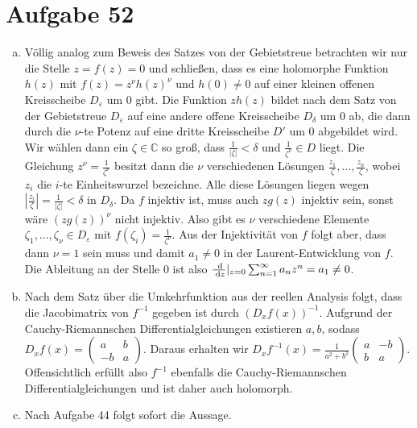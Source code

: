 \documentclass{article}
\theoremstyle{definition}
\newcommand{\C}{\mathbb{C}}
\renewcommand{\epsilon}{\varepsilon}
\newcommand{\dv}[2]{\frac{\d #1 }{\d #2 }}
\begin{document}
\section*{Aufgabe 52}
\begin{enumerate}[(a)]  
    \item Völlig analog zum Beweis des Satzes von der Gebietstreue betrachten wir nur die Stelle $z = f(z) = 0$ und schließen, dass es eine holomorphe Funktion $h(z)$ mit $f(z) = z^\nu h(z)^\nu$ und $h(0)\neq 0$ auf einer kleinen offenen Kreisscheibe $D_\epsilon$ um $0$ gibt. Die Funktion $zh(z)$ bildet nach dem Satz von der Gebietstreue $D_\epsilon$ auf eine andere offene Kreisscheibe $D_\delta$ um $0$ ab, die dann durch die $\nu$-te Potenz auf eine dritte Kreisscheibe $D'$ um 0 abgebildet wird. Wir wählen dann ein $\zeta \in \C$ so groß, dass $\frac{1}{|\zeta|} < \delta$ und $\frac{1}{\zeta^\nu}\in D$ liegt. Die Gleichung $z^\nu = \frac{1}{\zeta^\nu}$ besitzt dann die $\nu$ verschiedenen Lösungen $\frac{z_1}{\zeta}, \dots, \frac{z_n}{\zeta}$, wobei $z_i$ die $i$-te Einheitswurzel bezeichne. Alle diese Lösungen liegen wegen $\left|\frac{z_i}{\zeta}\right| = \frac{1}{|\zeta|} < \delta$ in $D_\delta$. Da $f$ injektiv ist, muss auch $zg(z)$ injektiv sein, sonst wäre $(zg(z))^\nu$ nicht injektiv. Also gibt es $\nu$ verschiedene Elemente $\zeta_1,\dots, \zeta_\nu\in D_\epsilon$ mit $f(\zeta_i) = \frac{1}{\zeta^\nu}$. Aus der Injektivität von $f$ folgt aber, dass dann $\nu = 1$ sein muss und damit $a_1 \neq 0$ in der Laurent-Entwicklung von $f$. Die Ableitung an der Stelle 0 ist also $\dv{}{z}|_{z=0} \sum_{n = 1}^{\infty}a_nz^n = a_1 \neq 0$.
    \item Nach dem Satz über die Umkehrfunktion aus der reellen Analysis folgt, dass die Jacobimatrix von $f^{-1}$ gegeben ist durch $\left(D_xf(x)\right)^{-1}$. Aufgrund der Cauchy-Riemannschen Differentialgleichungen existieren $a,b$, sodass $D_xf(x) = \begin{pmatrix}
        a & b\\
        -b & a
    \end{pmatrix}$. Daraus erhalten wir $D_xf^{-1}(x) = \frac{1}{a^2+b^2}\begin{pmatrix}
        a & -b\\
        b & a
    \end{pmatrix}$. Offensichtlich erfüllt also $f^{-1}$ ebenfalls die Cauchy-Riemannschen Differentialgleichungen und ist daher auch holomorph.
    \item Nach Aufgabe 44 folgt sofort die Aussage.
\end{enumerate}
\end{document}
